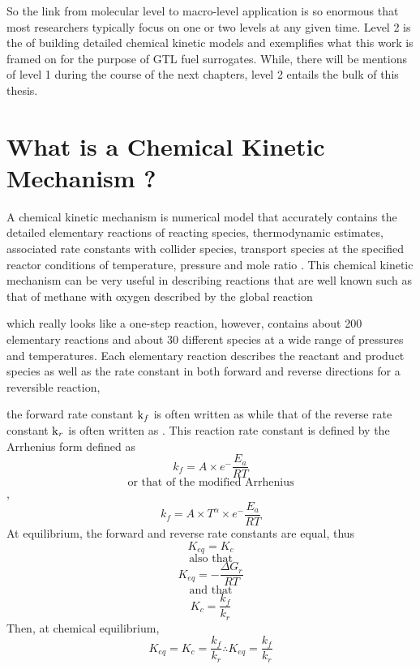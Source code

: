  So the link from molecular level to macro-level application is so enormous that most researchers typically focus on one or two levels at any given time. Level 2 is the of building detailed chemical kinetic models and exemplifies what this work is framed on for the purpose of GTL fuel surrogates. While, there will be mentions of level 1 during the course of the next chapters, level 2 entails the bulk of this thesis. 
 
 
\section{What is a Chemical Kinetic Mechanism ?}
 A chemical kinetic mechanism is numerical model that accurately contains the detailed elementary reactions of reacting species, thermodynamic estimates, associated rate constants with collider species, transport species at the specified reactor conditions of temperature, pressure and mole ratio \cite{Curran2019DevelopingCombustion}. This chemical kinetic mechanism can be very useful in describing reactions that are well known such as that of methane with oxygen described by the global reaction 
 
 
 
 which really looks like a one-step reaction, however, contains about 200 elementary reactions and about 30 different species at a wide range of pressures and temperatures. Each elementary reaction describes the reactant and product species as well as the rate constant in both forward and reverse directions for a reversible reaction,
 
  
 the forward rate constant $\ce{k_f}$ is often written as  while that of the reverse rate constant $\ce{k_r}$ is often written as . This reaction rate constant is defined by the Arrhenius form defined as
 \begin{equation}
    k_f = A\times e^-{\frac{E_a}{RT}}
 \end{equation}
 \[\text{or that of the modified Arrhenius}\], 
 \begin{equation}
    k_f=A\times T^{\alpha}\times e^-{\frac{E_a}{RT}}
 \end{equation}
  At equilibrium, the forward and reverse rate constants are equal, thus
  \begin{equation}
  K_{eq}=K_c
  \end{equation}
  \[\text{also that} \]
  \begin{equation}
      K_{eq}=-\frac{\Delta G_r}{RT} 
  \end{equation}
  \[\text{and that}\]
  \begin{equation}
     K_c=\frac{k_f}{k_r}
  \end{equation}
  Then, at chemical equilibrium, 
  \begin{equation}
     K_{eq}=K_c=\frac{k_f}{k_r}
     \therefore K_{eq} = \frac{k_f}{k_r}
  \end{equation}
  
